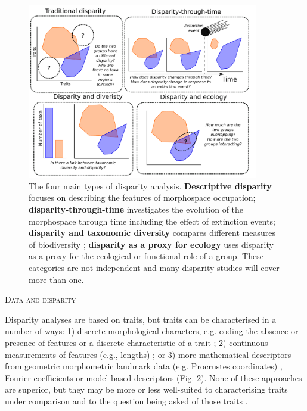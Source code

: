 \documentclass[12pt,letterpaper]{article}
\renewcommand{\section}[1]{%
\bigskip
\begin{center}
\begin{Large}
\normalfont\scshape #1
\medskip
\end{Large}
\end{center}}
\begin{document}
\begin{figure}[!htbp]
\centering
   \includegraphics[width=0.9\textwidth]{Figures/figure_disparities.pdf}
\caption{
    The four main types of disparity analysis. \textbf{Descriptive disparity} focuses on describing the features of morphospace occupation; \textbf{disparity-through-time} investigates the evolution of the morphospace through time including the effect of extinction events; \textbf{disparity and taxonomic diversity} compares different measures of biodiversity ; \textbf{disparity as a proxy for ecology} uses disparity as a proxy for the ecological or functional role of a group.
    These categories are not independent and many disparity studies will cover more than one.
}
\label{Fig:disparity}
\end{figure}



\section{Data and disparity}
\label{section:data}

\noindent Disparity analyses are based on traits, but traits can be characterised in a number of ways:
	1) discrete morphological characters, e.g. coding the absence or presence of features or a discrete characteristic of a trait \citep[][e.g]{Foote1989-fd, Deline2018-le};
	2) continuous measurements of features (e.g., lengths) \citep[][e.g]{Anderson2001-qb}; or
	3) more mathematical descriptors from geometric morphometric landmark data (e.g. Procrustes coordinates) \citep[][e.g]{Cooney2017-ly}, Fourier coefficients \citep[][e.g]{Foote1995-do, Spriggs2018-nu} or model-based descriptors \citep{Raup1961-vx,Saunders2004} (Fig. 2).
None of these approaches are superior, but they may be more or less well-suited to characterising traits under comparison and to the question being asked of those traits \citep{hetherington2015cladistic,Hopkins2017-cf}.
\end{document}
